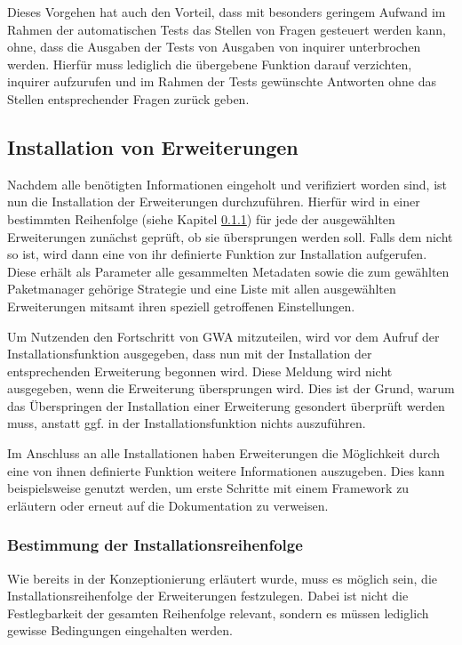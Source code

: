 Dieses Vorgehen hat auch den Vorteil, dass mit besonders geringem Aufwand im Rahmen der automatischen Tests das Stellen von Fragen gesteuert werden kann, ohne, dass die Ausgaben der Tests von Ausgaben von inquirer unterbrochen werden. Hierfür muss lediglich die übergebene Funktion darauf verzichten, inquirer aufzurufen und im Rahmen der Tests gewünschte Antworten ohne das Stellen entsprechender Fragen zurück geben.

\subsection{Installation von Erweiterungen}
Nachdem alle benötigten Informationen eingeholt und verifiziert worden sind, ist nun die Installation der Erweiterungen durchzuführen. Hierfür wird in einer bestimmten Reihenfolge (siehe Kapitel \ref{impl:determine_installation_order}) für jede der ausgewählten Erweiterungen zunächst geprüft, ob sie übersprungen werden soll. Falls dem nicht so ist, wird dann eine von ihr definierte Funktion zur Installation aufgerufen. Diese erhält als Parameter alle gesammelten Metadaten sowie die zum gewählten Paketmanager gehörige Strategie und eine Liste mit allen ausgewählten Erweiterungen mitsamt ihren speziell getroffenen Einstellungen.

Um Nutzenden den Fortschritt von \gls{GWA} mitzuteilen, wird vor dem Aufruf der Installationsfunktion ausgegeben, dass nun mit der Installation der entsprechenden Erweiterung begonnen wird. Diese Meldung wird nicht ausgegeben, wenn die Erweiterung übersprungen wird. Dies ist der Grund, warum das Überspringen der Installation einer Erweiterung gesondert überprüft werden muss, anstatt ggf. in der Installationsfunktion nichts auszuführen.

Im Anschluss an alle Installationen haben Erweiterungen die Möglichkeit durch eine von ihnen definierte Funktion weitere Informationen auszugeben. Dies kann beispielsweise genutzt werden, um erste Schritte mit einem Framework zu erläutern oder erneut auf die Dokumentation zu verweisen.

\subsubsection{Bestimmung der Installationsreihenfolge}
\label{impl:determine_installation_order}
Wie bereits in der Konzeptionierung erläutert wurde, muss es möglich sein, die Installationsreihenfolge der Erweiterungen festzulegen. Dabei ist nicht die Festlegbarkeit der gesamten Reihenfolge relevant, sondern es müssen lediglich gewisse Bedingungen eingehalten werden.

